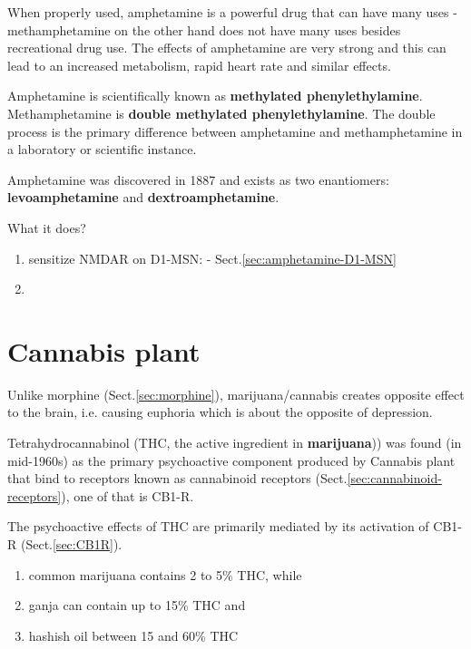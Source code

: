 When properly used, amphetamine is a powerful drug that can have many uses -
methamphetamine on the other hand does not have many uses besides recreational
drug use. The effects of amphetamine are very strong and this can lead to an
increased metabolism, rapid heart rate and similar effects.

Amphetamine is scientifically known as {\bf methylated phenylethylamine}.
Methamphetamine is {\bf double methylated phenylethylamine}. The double process
is the primary difference between amphetamine and methamphetamine in a
laboratory or scientific instance.

Amphetamine was discovered in 1887 and exists as two enantiomers:
{\bf levoamphetamine} and {\bf dextroamphetamine}.

What it does?
\begin{enumerate}
  \item sensitize NMDAR on D1-MSN: - Sect.\ref{sec:amphetamine-D1-MSN}
  
  \item 
\end{enumerate}

\section{Cannabis plant}
\label{sec:cannabis}
\label{sec:tetrahydrocannabinol}


Unlike morphine (Sect.\ref{sec:morphine}), marijuana/cannabis creates opposite
effect to the brain, i.e. causing euphoria which is about the opposite of
depression.

Tetrahydrocannabinol (THC, the active ingredient in {\bf
marijuana})) was found (in mid-1960s) as the primary psychoactive component 
produced by Cannabis plant that bind to receptors known as cannabinoid receptors
(Sect.\ref{sec:cannabinoid-receptors}), one of that is CB1-R. 

The psychoactive effects of THC are primarily mediated by its activation of
CB1-R (Sect.\ref{sec:CB1R}).

\begin{enumerate}
  \item  common marijuana contains 2 to 5\% THC, while 
  
  \item ganja can contain up to   15\% THC and 
  
  \item hashish oil between 15 and 60\%   THC
\end{enumerate}


